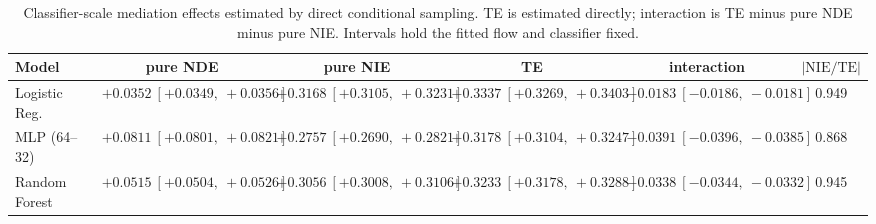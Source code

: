 \begin{table}[htbp]
  \centering
  \caption{Classifier-scale mediation effects estimated by direct conditional sampling. TE is estimated directly; interaction is TE minus pure NDE minus pure NIE. Intervals hold the fitted flow and classifier fixed.}
  \label{tab:german_synth_m2_gap_overall}
  \begin{tabular}{lccccc}
    \toprule
    Model & pure NDE & pure NIE & TE & interaction & $|\mathrm{NIE}/\mathrm{TE}|$ \\
    \midrule
    Logistic Reg. & $+0.0352\ [+0.0349,\ +0.0356]$ & $+0.3168\ [+0.3105,\ +0.3231]$ & $+0.3337\ [+0.3269,\ +0.3403]$ & $-0.0183\ [-0.0186,\ -0.0181]$ & 0.949 \\
    MLP (64--32) & $+0.0811\ [+0.0801,\ +0.0821]$ & $+0.2757\ [+0.2690,\ +0.2821]$ & $+0.3178\ [+0.3104,\ +0.3247]$ & $-0.0391\ [-0.0396,\ -0.0385]$ & 0.868 \\
    Random Forest & $+0.0515\ [+0.0504,\ +0.0526]$ & $+0.3056\ [+0.3008,\ +0.3106]$ & $+0.3233\ [+0.3178,\ +0.3288]$ & $-0.0338\ [-0.0344,\ -0.0332]$ & 0.945 \\
    \bottomrule
  \end{tabular}
\end{table}